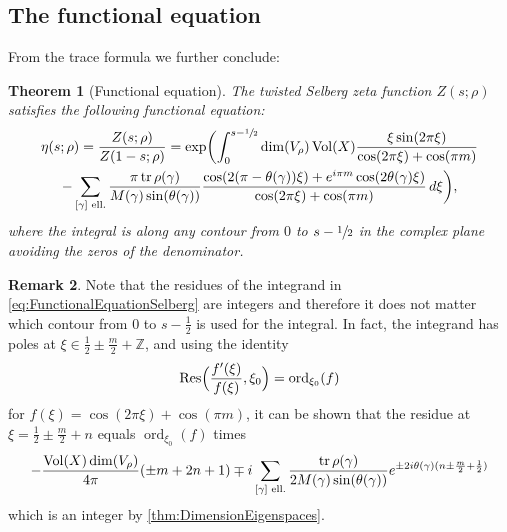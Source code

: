 \documentclass[JEP,XML,SOM,Unicode,NoFloatCountersInSection,published]{cedram}
\theoremstyle{plain}
\newtheorem{thm}{Theorem}[subsection]
\theoremstyle{definition}
\newtheorem{rmrk}[thm]{Remark}
\theoremstyle{remark}
\newcommand{\Z}{\mathbb{Z}}
\DeclareMathOperator{\tr}{tr}
\DeclareMathOperator{\Vol}{Vol}
\DeclareMathOperator{\Res}{Res}
\numberwithin{equation}{section}
\begin{document}
\subsection{The functional equation}
\label{subsec:FE}
From the trace formula we further conclude:

\begin{thm}[Functional equation]
\label{theo:Funct}
The twisted Selberg zeta function $Z(s;\rho)$ satisfies the following functional equation:
\begin{multline}
\eta(s;\rho) = \frac{Z(s;\rho)}{Z(1-s;\rho)} = \exp\biggl(\int_0^{s-\sfrac{1}{2}}\dim(V_\rho)\Vol(X)\frac{\xi\sin(2\pi\xi)}{\cos(2\pi\xi)+\cos(\pi m)}\\
- \sum_{[\gamma]\textup{ ell.}}\frac{\pi\tr\rho(\gamma)}{M(\gamma)\sin(\theta(\gamma))}\frac{\cos(2(\pi-\theta(\gamma))\xi)+e^{i\pi m}\cos(2\theta(\gamma)\xi)}{\cos(2\pi\xi)+\cos(\pi m)}\,d\xi\biggr),\label{eq:FunctionalEquationSelberg}
\end{multline}
where the integral is along any contour from $0$ to $s-\sfrac{1}{2}$ in the complex plane avoiding the zeros of the denominator.
\end{thm}

\begin{rmrk}
Note that the residues of the integrand in \cref{eq:FunctionalEquationSelberg} are integers and therefore it does not matter which contour from $0$ to $s-\frac{1}{2}$ is used for the integral. In fact, the integrand has poles at $\xi\in\frac{1}{2}\pm\frac{m}{2}+\Z$, and using the identity
\[
\Res\Bigl(\frac{f'(\xi)}{f(\xi)},\xi_0\Bigr) = \operatorname{ord}_{\xi_0}(f)
\]
for $f(\xi)=\cos(2\pi\xi)+\cos(\pi m)$, it can be shown that the residue at $\xi=\frac{1}{2}\pm\frac{m}{2}+n$ equals $\operatorname{ord}_{\xi_0}(f)$ times
\[
-\frac{\Vol(X)\dim(V_\rho)}{4\pi}(\pm m+2n+1) \mp i\sum_{[\gamma]\\\textup{ ell.}}\frac{\tr\rho(\gamma)}{2M(\gamma)\sin(\theta(\gamma))}e^{\pm2i\theta(\gamma)(n\pm\frac{m}{2}+\frac{1}{2})}
\]
which is an integer by \cref{thm:DimensionEigenspaces}.
\end{rmrk}
\end{document}
